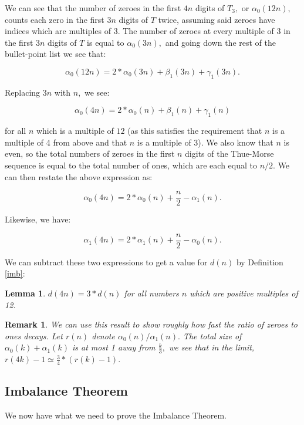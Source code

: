\documentclass{article}
\newtheorem{lemma}{Lemma}[section]
\newtheorem{remark}{Remark}[section]
\begin{document}
We can see that the number of zeroes in the first $4n$ digits of $T_3,$ or $\alpha_0(12n),$ counts each zero in the first $3n$ digits of $T$ twice, assuming said zeroes have indices which are multiples of 3. The number of zeroes at every multiple of 3 in the first $3n$ digits of $T$ is equal to $\alpha_0(3n),$ and going down the rest of the bullet-point list we see that:

$$\alpha_0(12n) = 2 * \alpha_0(3n) + \beta_1(3n) + \gamma_1(3n).$$

Replacing $3n$ with $n,$ we see:

$$\alpha_0(4n) = 2 * \alpha_0(n) + \beta_1(n) + \gamma_1(n)$$

for all $n$ which is a multiple of $12$ (as this satisfies the requirement that $n$ is a multiple of 4 from above and that $n$ is a multiple of 3).
We also know that $n$ is even, so the total numbers of zeroes in the first $n$ digits of the Thue-Morse sequence is equal to the total number of ones, which are each equal to $n/2.$ We can then restate the above expression as:

$$\alpha_0(4n) = 2 * \alpha_0(n) + \frac{n}{2} - \alpha_1(n).$$

Likewise, we have:

$$\alpha_1(4n) = 2 * \alpha_1(n) + \frac{n}{2} - \alpha_0(n).$$

We can subtract these two expressions to get a value for $d(n)$ by Definition \ref{imb}:

\begin{lemma}
\label{ratiospec}
$d(4n) = 3 * d(n)$ for all numbers $n$ which are positive multiples of 12.
\end{lemma}

\begin{remark}
We can use this result to show roughly how fast the ratio of zeroes to ones decays. Let $r(n)$ denote $\alpha_0(n)/\alpha_1(n).$ The total size of $\alpha_0(k) + \alpha_1(k)$ is at most 1 away from $\frac{k}{3},$ we see that in the limit, $r(4k) - 1 \simeq \frac{3}{4} * (r(k) - 1).$
\end{remark}

\subsection{Imbalance Theorem}

We now have what we need to prove the Imbalance Theorem.
\end{document}
